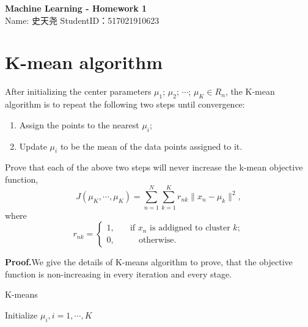 \documentclass[12pt,a4paper,UTF8,fntef]{article}
\begin{document}
\begin{center}
\LARGE{\textbf{Machine Learning - Homework 1}}\vspace{1mm}\\
\footnotesize{Name: 史天尧 \qquad StudentID：517021910623}
\end{center}

\section{K-mean algorithm}
After initializing the center parameters $\mu_1$; $\mu_2$; $\cdots$; $\mu_K \in R_n$, the K-mean algorithm is to repeat the following two steps until convergence:
\begin{enumerate}
 \item Assign the points to the nearest $\mu_i$;
 \item Update $\mu_i$ to be the mean of the data points assigned to it.
\end{enumerate}
Prove that each of the above two steps will never increase the k-mean objective function,
\begin{equation}
J(\mu_K,\cdots,\mu_K)=\sum^N_{n=1}\sum^K_{k=1}r_{nk}\|x_n-\mu_k\|^2,
\end{equation}
where
\begin{equation}
	r_{nk}=\left\{\begin{matrix}
	1,&\quad \text{if }x_n\text{ is addigned to cluster } k;\\
	0,&\qquad \text{otherwise.}
	\end{matrix}\right.
\end{equation}

\textbf{Proof.}\quad We give the details of K-means algorithm to prove, that the objective function is non-increasing in every iteration and every stage.\newline
	\begin{algorithm}[H]
		\caption{K-means}
		\BlankLine
		Initialize $\mu_i,i=1,\cdots,K$\\
	\end{algorithm}
\end{document}
